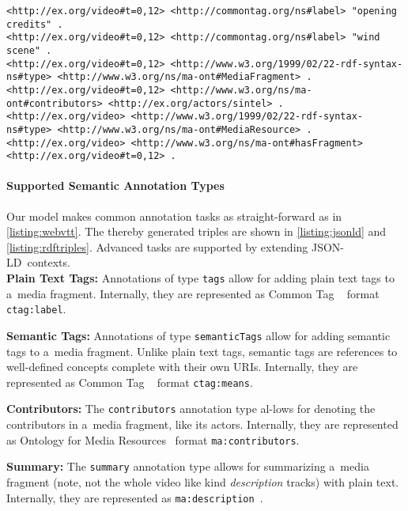 \documentclass{sig-alternate}
\def\JSONLD{\mbox{JSON-LD}}
\begin{document}
\begin{lstlisting}[caption={RDF triples based on the \JSONLD\ code from \autoref{listing:jsonld}},
  label=listing:rdftriples, float=t!]
<http://ex.org/video#t=0,12> <http://commontag.org/ns#label> "opening credits" .
<http://ex.org/video#t=0,12> <http://commontag.org/ns#label> "wind scene" .
<http://ex.org/video#t=0,12> <http://www.w3.org/1999/02/22-rdf-syntax-ns#type> <http://www.w3.org/ns/ma-ont#MediaFragment> .
<http://ex.org/video#t=0,12> <http://www.w3.org/ns/ma-ont#contributors> <http://ex.org/actors/sintel> .
<http://ex.org/video> <http://www.w3.org/1999/02/22-rdf-syntax-ns#type> <http://www.w3.org/ns/ma-ont#MediaResource> .
<http://ex.org/video> <http://www.w3.org/ns/ma-ont#hasFragment> <http://ex.org/video#t=0,12> .
\end{lstlisting}

\paragraph{Supported Semantic Annotation Types}

Our model makes common annotation tasks as
straight-forward as in \autoref{listing:webvtt}.
The thereby generated triples are shown in
\autoref{listing:jsonld} and \autoref{listing:rdftriples}.
Advanced tasks are supported by extending \JSONLD\ contexts.\\

\noindent \textbf{Plain Text Tags:} Annotations of type
  \texttt{tags} allow for add\-ing plain text tags
  to a~media fragment.
  Internally, they are represented as Common Tag%
  ~\cite{commontag2009spec} format \texttt{ctag:label}.

\noindent \textbf{Semantic Tags:} Annotations of type
  \texttt{semanticTags} allow for adding semantic tags
  to a~media fragment.
  Unlike plain text tags, semantic tags are references to
  well-defined concepts complete with their own URIs.
  Internally, they are represented as Common Tag%
  ~\cite{commontag2009spec} format \texttt{ctag:means}.

\noindent \textbf{Contributors:} The \texttt{contributors} annotation type
  al-\linebreak lows for denoting the contributors in a~media fragment, like its actors.
  Internally, they are represented as
  Ontology for Media Resources~\cite{lee2012mediaontology}
  format \texttt{ma:contributors}.

\noindent \textbf{Summary:} The \texttt{summary} annotation type
  allows for summarizing a~media fragment
  (note, not the whole video like kind \emph{description} tracks)
  with plain text.
  Internally, they are represented as  
  \texttt{ma:description}~\cite{lee2012mediaontology}.
\end{document}
